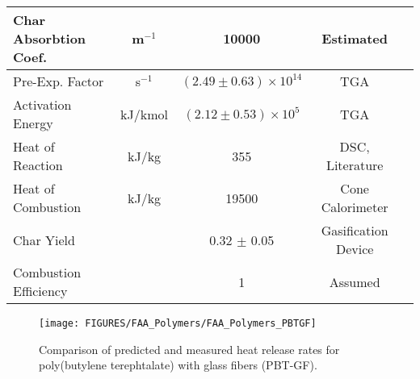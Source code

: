 \begin{table}[h!]
\begin{center}
\begin{tabular}{|l|c|c|c|c|}
Char Absorbtion Coef.   &      m$^{-1}$ &       10000                       & Estimated                 & \cite{Kempel:1}   \\ \hline
Pre-Exp. Factor         &      s$^{-1}$ & $(2.49 \pm 0.63) \times 10^{14}$  & TGA                       & \cite{Kempel:1}   \\ \hline
Activation Energy       &    kJ/kmol    & $(2.12 \pm 0.53) \times 10^{5}$   & TGA                       & \cite{Kempel:1}   \\ \hline
Heat of Reaction        &      kJ/kg    &        355                        & DSC, Literature           & \cite{Kempel:1,Lyon:Ency2005} \\ \hline
Heat of Combustion      &      kJ/kg    & 19500                             & Cone Calorimeter          & \cite{Kempel:1}   \\ \hline
Char Yield              &               & 0.32 $\pm$ 0.05                   & Gasification Device       & \cite{Kempel:1}   \\ \hline
Combustion Efficiency   &               &          1                        & Assumed                   & \cite{Kempel:1}   \\ \hline
\end{tabular}
\end{center}
\label{Properties_PBT-GF}
\end{table}

\begin{figure}[h!]
\begin{center}
\texttt{[image: FIGURES/FAA\_Polymers/FAA\_Polymers\_PBTGF]}
\caption[Heat release rate of poly(butylene terephtalate) with glass fibers (PBT-GF).]
{Comparison of predicted and measured heat release rates for poly(butylene terephtalate) with glass fibers (PBT-GF).}
\label{HRR_PBTGF}
\end{center}
\end{figure}


